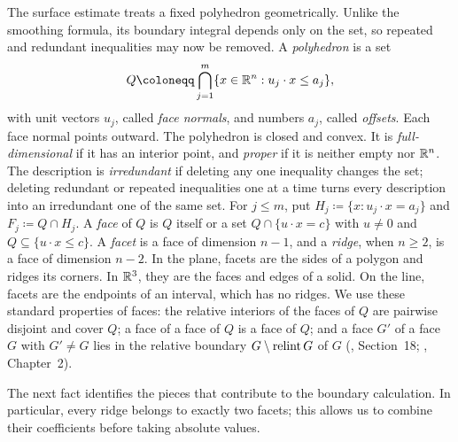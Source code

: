 The surface estimate treats a fixed polyhedron geometrically. Unlike
the smoothing formula, its boundary integral depends only on the set,
so repeated and redundant inequalities may now be removed.
A \emph{polyhedron} is a set
\[
 Q\coloneqq \bigcap_{j=1}^m\{x\in\R^n:u_j\cdot x\le a_j\},
\]
with unit vectors \(u_j\), called \emph{face normals}, and numbers
\(a_j\), called \emph{offsets}. Each face normal points outward.
The polyhedron is closed and convex. It is
\emph{full-dimensional} if it has an interior point, and \emph{proper} if it
is neither empty nor \(\mathbb R^n\). The description is \emph{irredundant} if
deleting any one inequality changes the set; deleting redundant or repeated
inequalities one at a time turns every description into an irredundant one
of the same set. For \(j\le m\), put \(H_j\coloneqq \{x:u_j\cdot x=a_j\}\) and
\(F_j\coloneqq Q\cap H_j\). A \emph{face} of \(Q\) is \(Q\) itself or a set
\(Q\cap\{u\cdot x=c\}\) with \(u\ne0\) and \(Q\subseteq\{u\cdot x\le c\}\).
A \emph{facet} is a face of dimension \(n-1\), and a \emph{ridge}, when \(n\ge2\), is a face
of dimension \(n-2\). In the plane, facets are the sides of a polygon
and ridges its corners. In \(\mathbb R^3\), they are the faces and edges of a solid.
On the line, facets are the endpoints of an interval, which has no ridges. We use these standard properties of faces:
the relative interiors of the faces of \(Q\) are pairwise disjoint and cover
\(Q\); a face of a face of \(Q\) is a face of \(Q\); and a face \(G'\)
of a face \(G\) with \(G'\ne G\) lies in the relative boundary
\(G\setminus\operatorname{relint} G\) of \(G\) (, Section~18; , Chapter~2).

The next fact identifies the pieces that contribute to the boundary
calculation. In particular, every ridge belongs to exactly two facets;
this allows us to combine their coefficients before taking absolute values.

